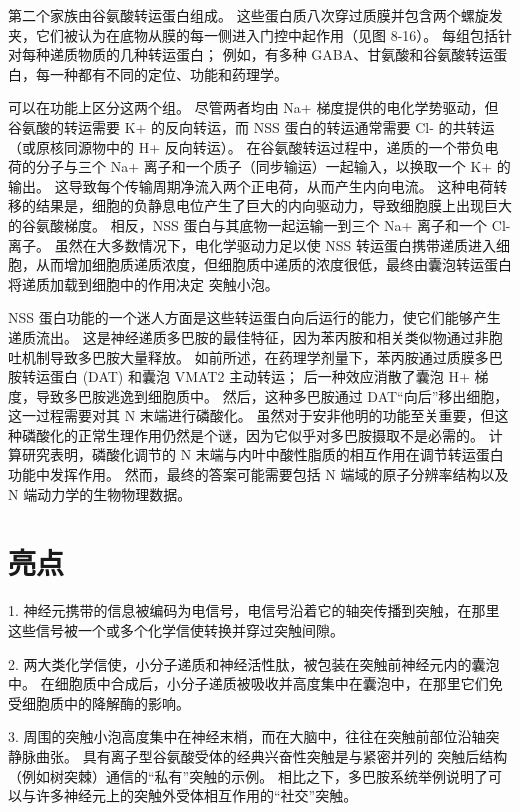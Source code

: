 第二个家族由谷氨酸转运蛋白组成。 
这些蛋白质八次穿过质膜并包含两个螺旋发夹，它们被认为在底物从膜的每一侧进入门控中起作用（见图 8-16）。 
每组包括针对每种递质物质的几种转运蛋白； 例如，有多种 GABA、甘氨酸和谷氨酸转运蛋白，每一种都有不同的定位、功能和药理学。


可以在功能上区分这两个组。 
尽管两者均由 Na+ 梯度提供的电化学势驱动，但谷氨酸的转运需要 K+ 的反向转运，而 NSS 蛋白的转运通常需要 Cl- 的共转运（或原核同源物中的 H+ 反向转运）。 
在谷氨酸转运过程中，递质的一个带负电荷的分子与三个 Na+ 离子和一个质子（同步输运）一起输入，以换取一个 K+ 的输出。 
这导致每个传输周期净流入两个正电荷，从而产生内向电流。 这种电荷转移的结果是，细胞的负静息电位产生了巨大的内向驱动力，导致细胞膜上出现巨大的谷氨酸梯度。 
相反，NSS 蛋白与其底物一起运输一到三个 Na+ 离子和一个 Cl- 离子。 
虽然在大多数情况下，电化学驱动力足以使 NSS 转运蛋白携带递质进入细胞，从而增加细胞质递质浓度，但细胞质中递质的浓度很低，最终由囊泡转运蛋白将递质加载到细胞中的作用决定 突触小泡。


NSS 蛋白功能的一个迷人方面是这些转运蛋白向后运行的能力，使它们能够产生递质流出。 
这是神经递质多巴胺的最佳特征，因为苯丙胺和相关类似物通过非胞吐机制导致多巴胺大量释放。 
如前所述，在药理学剂量下，苯丙胺通过质膜多巴胺转运蛋白 (DAT) 和囊泡 VMAT2 主动转运； 
后一种效应消散了囊泡 H+ 梯度，导致多巴胺逃逸到细胞质中。 
然后，这种多巴胺通过 DAT“向后”移出细胞，这一过程需要对其 N 末端进行磷酸化。 
虽然对于安非他明的功能至关重要，但这种磷酸化的正常生理作用仍然是个谜，因为它似乎对多巴胺摄取不是必需的。 
计算研究表明，磷酸化调节的 N 末端与内叶中酸性脂质的相互作用在调节转运蛋白功能中发挥作用。 
然而，最终的答案可能需要包括 N 端域的原子分辨率结构以及 N 端动力学的生物物理数据。



\section{亮点}

1. 神经元携带的信息被编码为电信号，电信号沿着它的轴突传播到突触，在那里这些信号被一个或多个化学信使转换并穿过突触间隙。 


2. 两大类化学信使，小分子递质和神经活性肽，被包装在突触前神经元内的囊泡中。 
在细胞质中合成后，小分子递质被吸收并高度集中在囊泡中，在那里它们免受细胞质中的降解酶的影响。 


3. 周围的突触小泡高度集中在神经末梢，而在大脑中，往往在突触前部位沿轴突静脉曲张。 
具有离子型谷氨酸受体的经典兴奋性突触是与紧密并列的
突触后结构（例如树突棘）通信的“私有”突触的示例。 相比之下，多巴胺系统举例说明了可以与许多神经元上的突触外受体相互作用的“社交”突触。 


